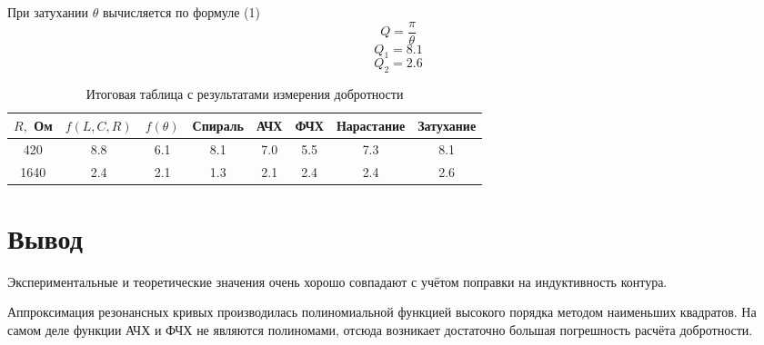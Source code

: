 \documentclass[a4paper,12 pt]{article}
\begin{document}
При затухании $\theta$ вычисляется по формуле (1)
\[Q = \frac{\pi}{\theta}\]
\[Q_1 = 8.1\]
\[Q_2 = 2.6\]









\begin{table}[H]
\centering
\begin{tabular}{|c|c|c|c|c|c|c|c|}
\hline
$R,$ Ом & $f(L, C, R)$ & $f(\theta)$ & Спираль & АЧХ & ФЧХ & Нарастание & Затухание \\ \hline
420 & 8.8 & 6.1 & 8.1 & 7.0 & 5.5 & 7.3 & 8.1 \\
\hline
1640 & 2.4 & 2.1 & 1.3 & 2.1 & 2.4 & 2.4 & 2.6 \\
\hline
\end{tabular}
\caption{Итоговая таблица с результатами измерения добротности}
\label{tab:final_table}
\end{table}
\section{Вывод}

Экспериментальные и теоретические значения очень хорошо совпадают с учётом поправки на индуктивность контура.

Аппроксимация резонансных кривых производилась полиномиальной функцией высокого порядка методом наименьших квадратов. На самом деле функции АЧХ и ФЧХ не являются полиномами, отсюда возникает достаточно большая погрешность расчёта добротности.
\end{document}
